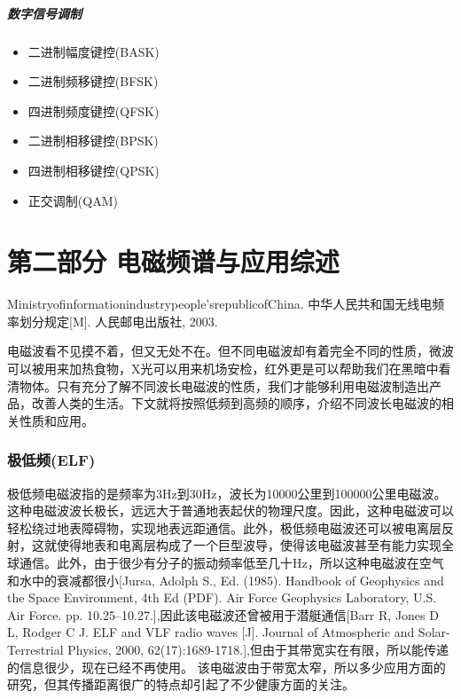 \documentclass[UTF8]{article}
\begin{document}
\begin{CJK}{UTF8}{gkai}
\subsubsection{数字信号调制}
\begin{itemize}
\item  二进制幅度键控(BASK)
\item  二进制频移键控(BFSK)
\item  四进制频度键控(QFSK)
\item  二进制相移键控(BPSK)
\item  四进制相移键控(QPSK)
\item  正交调制(QAM)
\end{itemize}
\clearpage
\part{第二部分 电磁频谱与应用综述}

Ministryofinformationindustrypeople'srepublicofChina. 中华人民共和国无线电频率划分规定[M]. 人民邮电出版社, 2003.

电磁波看不见摸不着，但又无处不在。但不同电磁波却有着完全不同的性质，微波可以被用来加热食物，X光可以用来机场安检，红外更是可以帮助我们在黑暗中看清物体。只有充分了解不同波长电磁波的性质，我们才能够利用电磁波制造出产品，改善人类的生活。下文就将按照低频到高频的顺序，介绍不同波长电磁波的相关性质和应用。
\setcounter{section}{0}
\section{极低频(ELF)}
极低频电磁波指的是频率为3Hz到30Hz，波长为10000公里到100000公里电磁波。这种电磁波波长极长，远远大于普通地表起伏的物理尺度。因此，这种电磁波可以轻松绕过地表障碍物，实现地表远距通信。此外，极低频电磁波还可以被电离层反射，这就使得地表和电离层构成了一个巨型波导，使得该电磁波甚至有能力实现全球通信。此外，由于很少有分子的振动频率低至几十Hz，所以这种电磁波在空气和水中的衰减都很小[Jursa, Adolph S., Ed. (1985). Handbook of Geophysics and the Space Environment, 4th Ed (PDF). Air Force Geophysics Laboratory, U.S. Air Force. pp. 10.25–10.27.],因此该电磁波还曾被用于潜艇通信[Barr R, Jones D L, Rodger C J. ELF and VLF radio waves [J]. Journal of Atmospheric and Solar-Terrestrial Physics, 2000, 62(17):1689-1718.],但由于其带宽实在有限，所以能传递的信息很少，现在已经不再使用。
该电磁波由于带宽太窄，所以多少应用方面的研究，但其传播距离很广的特点却引起了不少健康方面的关注。

\end{CJK}
\end{document}

